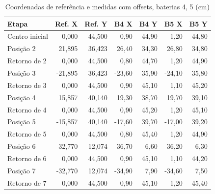 \begin{table}[H]\centering
\caption{Coordenadas de referência e medidas com offsets, baterias 4, 5 (cm)}
\label{tab:coordenadas-com-45}
\scriptsize\setlength{\tabcolsep}{2.4pt}
\begin{tabular}{lrrrrrr}\toprule
Etapa & Ref. X & Ref. Y & B4 X & B4 Y & B5 X & B5 Y \\
\midrule
Centro inicial & 0,000 & 44,500 & 0,90 & 44,90 & 1,20 & 44,80\\
Posição 2 & 21,895 & 36,423 & 26,40 & 34,30 & 26,80 & 34,80\\
Retorno de 2 & 0,000 & 44,500 & 0,80 & 44,70 & 1,20 & 44,90\\
Posição 3 & -21,895 & 36,423 & -23,60 & 35,90 & -24,10 & 35,80\\
Retorno de 3 & 0,000 & 44,500 & 0,90 & 45,10 & 1,10 & 45,20\\
Posição 4 & 15,857 & 40,140 & 19,30 & 38,70 & 19,70 & 39,10\\
Retorno de 4 & 0,000 & 44,500 & 0,90 & 45,20 & 1,20 & 45,10\\
Posição 5 & -15,857 & 40,140 & -17,60 & 39,70 & -17,00 & 39,20\\
Retorno de 5 & 0,000 & 44,500 & 0,80 & 45,40 & 1,20 & 44,90\\
Posição 6 & 32,770 & 12,074 & 36,70 & 6,60 & 36,20 & 6,30\\
Retorno de 6 & 0,000 & 44,500 & 0,90 & 45,10 & 1,10 & 44,20\\
Posição 7 & -32,770 & 12,074 & -34,90 & 7,90 & -34,60 & 7,50\\
Retorno de 7 & 0,000 & 44,500 & 0,90 & 45,10 & 1,20 & 45,40\\
\bottomrule\end{tabular}
\par{}
\end{table}
